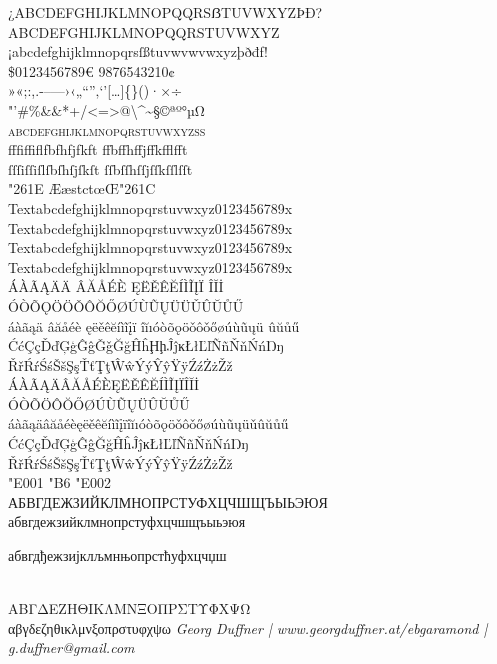 \documentclass[pagesize,DIV14]{scrartcl}
\begin{document}
\begin{center}{
¿ABCDEFGHIJKLMNOPQQRSẞTUVWXYZÞÐ?\\
{ABCDEFGHIJKLMNOPQQRSTUVWXYZ}
¡abcdefghijklmnopqrsſßtuvw{vw}{vw}xyzþðđf!\\
\$0123456789€  {9876543210}¢\\
»«;:,.-–—›‹„“”‚‘’[…]\{\}()·×÷\\
"'\#\%\&{\&}*+/<=>@\textbackslash \textasciicircum \textasciitilde §©ªº°µΩ\\
\textsc{abcdefghijklmnopqrstuvwxyzß}\\ 
fffiffiflfbfhfjfkft%
ffbffhffjffkfflfft\\
ſſſiſſiſlſbſhſjſkſt%
ſſbſſhſſjſſkſſlſſt\\
\char"261E ÆæstctœŒ\char"261C\\
{
Text{abcdefghijklmnopqrstuvwxyz0123456789}x\\
Text{abcdefghijklmnopqrstuvwxyz0123456789}x\\
Text{abcdefghijklmnopqrstuvwxyz0123456789}x\\
Text{abcdefghijklmnopqrstuvwxyz0123456789}x}\\
ÁÀÃĄÄ{Ä}%
ÂĂÅÉÈ%
ĘËĚÊĔÍÌĨĮÏ%
ÎĬİ\\
ÓÒÕǪÖ{Ö}ǑÔŎŐØÚÙŨŲÜ{Ü}ǓÛŬŮŰ\\
áàãąä%
âăåéè%
ęëěêĕíìĩįï%
îĭıóòõǫöǒôǒőøúùũųü%
ûŭůű\\
ĆćÇçĎďĢģĜĝǦǧĞğĤĥḨḩĴĵĸŁłĽľÑñŇňŃńŊŋ\\
ŘřŔŕŚśŠšŞşŤťŢţŴŵÝýŶŷŸÿŹźŻżŽž\\
{ÁÀÃĄÄÂĂÅÉÈĘËĚÊĔÍÌĨĮÏÎĬİ\\
ÓÒÕÖÔŎŐØÚÙŨŲÜÛŬŮŰ\\
áàãąäâăåéèęëěêĕíìĩįïîĭıóòõǫöǒôǒőøúùũųüǔûŭůű\\
ĆćÇçĎďĢģĜĝĞğĤĥĴĵĸŁłĽľÑñŇňŃńŊŋ\\
ŘřŔŕŚśŠšŞşŤťŢţŴŵÝýŶŷŸÿŹźŻżŽž}\\
\Huge \char"E001 \char"B6 \char"E002}\\
АБВГДЕЖЗИЙКЛМНОПРСТУФХЦЧШЩЪЫЬЭЮЯ\\
абвгдежзийклмнопрстуфхцчшщъыьэюя\\
\begin{serbian}{
абвгдђежзијклљмнњопрстћуфхцчџш}\end{serbian}\\
ΑΒΓΔΕΖΗΘΙΚΛΜΝΞΟΠΡΣΤΥΦΧΨΩ\\
αβγδεζηθικλμνξοπρστυφχψω
\vfill
\fontsize{12}{12}\scriptsize\textit{{G}eorg Duffner | w{ww}.georgduffner.at/ebgaramond | g.duffner@gmail.com}
\end{center}
\end{document}

